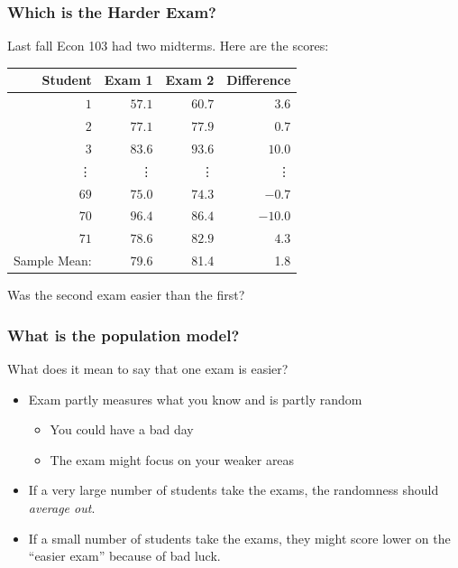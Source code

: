 \documentclass[handout]{beamer}
\begin{document}
\begin{frame}
\frametitle{Which is the Harder Exam?}
Last fall Econ 103 had two midterms. Here are the scores:
%
\begin{table}[!tbp]
\begin{center}
\begin{tabular}{rrrr}
\hline\hline
\multicolumn{1}{r}{Student}&\multicolumn{1}{r}{Exam 1}&\multicolumn{1}{r}{Exam 2}&\multicolumn{1}{r}{Difference}\tabularnewline
\hline
$ 1$&$57.1$&$60.7$&$  3.6$\tabularnewline
$ 2$&$77.1$&$77.9$&$  0.7$\tabularnewline
$ 3$&$83.6$&$93.6$&$ 10.0$\tabularnewline
\vdots&\vdots&\vdots&\vdots\\
$69$&$75.0$&$74.3$&$ -0.7$\tabularnewline
$70$&$96.4$&$86.4$&$-10.0$\tabularnewline
$71$&$78.6$&$82.9$&$  4.3$\tabularnewline
\hline
Sample Mean: & 79.6 & 81.4  &1.8\\
\hline
\end{tabular}
\end{center}
\end{table}

\alert{Was the second exam easier than the first?}
\end{frame}
\begin{frame}
\frametitle{What is the population model?}

\begin{block}{What does it mean to say that one exam is easier?} 
	\begin{itemize}
	\item Exam partly measures what you know and is partly random 
		\begin{itemize}
			\item You could have a bad day
			\item The exam might focus on your weaker areas
		\end{itemize}
	\item If a very large number of students take the exams, the randomness should \emph{average out}.
		\item If a small number of students take the exams, they might score lower on the ``easier exam'' because of bad luck.
	\end{itemize}
\end{block}




 \end{frame}
\end{document}
